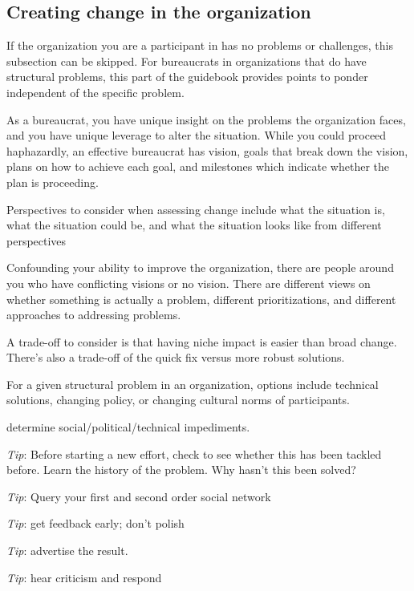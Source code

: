 \subsection{Creating change in the organization\label{sec:creating_change}}

If the organization you are a participant in has no problems or challenges, this subsection can be skipped. For bureaucrats in organizations that do have structural problems, this part of the guidebook provides points to ponder independent of the specific problem.

As a bureaucrat, you have unique insight on the problems the organization faces, and you have unique leverage to alter the situation.  While you could proceed haphazardly, an effective bureaucrat has vision, goals that break down the vision, plans on how to achieve each goal, and milestones which indicate whether the plan is proceeding. 

Perspectives to consider when assessing change include what the situation is, what the situation could be, and what the situation looks like from different perspectives

Confounding your ability to improve the organization, there are people around you who have conflicting visions or no vision. There are different views on whether something is actually a problem, different prioritizations, and different approaches to addressing problems.

A trade-off to consider is that having niche impact is easier than broad change. There's also a trade-off of the quick fix versus more robust solutions.

For a given structural problem in an organization, options include technical solutions, changing policy, or changing cultural norms of participants.

determine social/political/technical impediments. 

\textit{Tip}: Before starting a new effort, check to see whether this has been tackled before. Learn the history of the problem. Why hasn't this been solved?

\textit{Tip}: Query your first and second order social network

\textit{Tip}: get feedback early; don't polish

\textit{Tip}: advertise the result.

\textit{Tip}: hear criticism and respond
